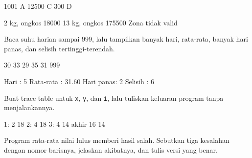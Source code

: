 \documentclass[a4paper]{article}
\begin{document}
\begin{MKeluaran}[title={Contoh masukan}]
1001 A
12500 C
300 D
\end{MKeluaran}
\begin{MKeluaran}[title={Keluaran yang diharapkan}]
2 kg, ongkos 18000
13 kg, ongkos 175500
Zona tidak valid
\end{MKeluaran}
Baca suhu harian sampai 999, lalu tampilkan banyak hari, rata-rata, banyak hari panas, dan selisih tertinggi-terendah.

\begin{MKeluaran}[title={Contoh masukan}]
30 33 29 35 31 999
\end{MKeluaran}
\begin{MKeluaran}[title={Keluaran yang diharapkan}]
Hari      : 5
Rata-rata : 31.60
Hari panas: 2
Selisih   : 6
\end{MKeluaran}
Buat trace table untuk \texttt{x}, \texttt{y}, dan \texttt{i}, lalu tuliskan keluaran program tanpa menjalankannya.

\begin{MKeluaran}[title={Keluaran yang diharapkan}]
1: 2 18
2: 4 18
3: 4 14
akhir 16 14
\end{MKeluaran}
Program rata-rata nilai lulus memberi hasil salah. Sebutkan tiga kesalahan dengan nomor barisnya, jelaskan akibatnya, dan tulis versi yang benar.
\end{document}
